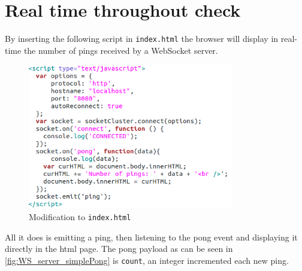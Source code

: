 
\chapter{Real time throughout check}
\label{indexHTML}

By inserting the following script in \texttt{index.html} the browser will
display in real-time the number of pings received by a WebSocket server.

\begin{figure}[H] \centering
  \includegraphics[width=0.8\textwidth]{./Figures/index_script.png}
\caption[Modification to index.html]{Modification to \texttt{index.html}}
\label{fig:index_script} \end{figure}

All it does is emitting a ping, then listening to the pong event and displaying
it directly in the html page. The pong payload as can be seen in
\ref{fig:WS_server_simplePong} is \texttt{count}, an integer incremented each
new ping.

